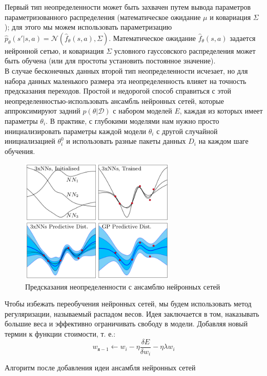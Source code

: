 \documentclass[a4paper,12pt]{article}
\begin{document}
Первый тип неопределенности может быть захвачен путем вывода параметров параметризованного распределения (математическое ожидание $\mu$ и ковариация $\Sigma$); для этого мы можем использовать параметризацию $\hat{p}_\theta(s'|s, a)=\mathcal{N}(\hat{f}_\theta(s,a),\Sigma)$.
Математическое ожидание $\hat{f}_\theta (s,a)$ задается нейронной сетью, и ковариация $\Sigma$ условного гауссовского распределения может быть обучена (или для простоты установить постоянное значение).\\

В случае бесконечных данных второй тип неопределенности исчезает, но для набора данных маленького размера эта неопределенность влияет на точность предсказания переходов. Простой и недорогой способ справиться с этой неопределенностью-использовать ансамбль нейронных сетей, которые аппроксимируют задний $p (\theta | \mathcal{D})$ с набором моделей $E$, каждая из которых имеет параметры $\theta_i$. 
В практике, с глубокими моделями нам нужно просто инициализировать параметры каждой модели $\theta_i$ с другой случайной инициализацией $\theta_i^0$ и использовать разные пакеты данных $D_i$ на каждом шаге обучения.

\begin{figure}[H]
    \centering
    \includegraphics[height=6cm]{img/ensemble_intro.png}
    \caption{Предсказания неопределенности с ансамблю нейронных сетей}
    \label{fig:my_label}
\end{figure}

Чтобы избежать переобучения нейронных сетей, мы будем использовать метод регуляризации, называемый распадом весов.  Идея заключается в том, наказывать большие веса и эффективно ограничивать свободу в модели. Добавляя новый термин к функции стоимости, т. е.:
$$w_{я-1} \leftarrow w_i - \eta \frac{\delta E} {\delta w_i} - \eta \lambda w_i$$

Алгоритм после добавления идеи ансамбля нейронных сетей\\
\end{document}
